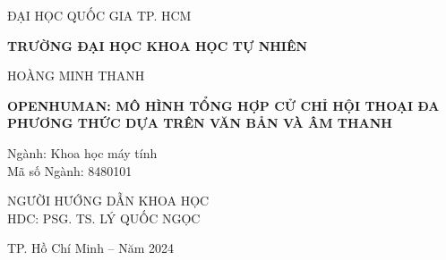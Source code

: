 \begin{titlepage}

\begin{mdframed}[linewidth=1pt, 
	linecolor=black, 
	innerleftmargin=10mm, 
	innerrightmargin=10mm, 
	innertopmargin=10mm, 
	innerbottommargin=10mm]

	\centering
	\vspace*{1cm}
	
	{ ĐẠI HỌC QUỐC GIA TP. HCM\par}
	\vspace{0.25cm}
	\textbf{TRƯỜNG ĐẠI HỌC KHOA HỌC TỰ NHIÊN}\\
	
	\vspace{2cm}
	
	\large HOÀNG MINH THANH \\
	
	\vspace{2cm}
	
	\Large \textbf{\MakeUppercase{OPENHUMAN: MÔ HÌNH TỔNG HỢP CỬ CHỈ HỘI THOẠI ĐA PHƯƠNG THỨC DỰA TRÊN VĂN BẢN VÀ ÂM THANH}}\\
	
	\vspace{1cm}
	
	\flushleft
	{\normalsize Ngành: Khoa học máy tính}\\
	{ \normalsize Mã số Ngành: 8480101}\\
	
	\vspace{2cm}
	
	\centering
	{\normalsize NGƯỜI HƯỚNG DẪN KHOA HỌC } \\ 
	{\normalsize HDC: PSG. TS. LÝ QUỐC NGỌC} \\
	
	\vfill
	\vspace{3cm}
	
	
	{\small TP. Hồ Chí Minh – Năm 2024}
\end{mdframed}
\end{titlepage}



\pagebreak
{}


\pagebreak
